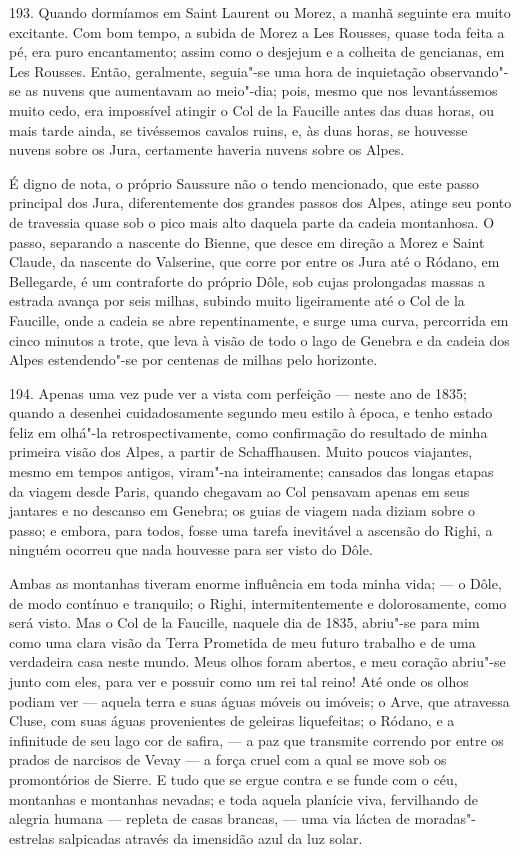193. Quando dormíamos em Saint Laurent ou Morez, a manhã seguinte era
muito excitante. Com bom tempo, a subida de Morez a Les Rousses, quase
toda feita a pé, era puro encantamento; assim como o desjejum e a
colheita de gencianas, em Les Rousses. Então, geralmente, seguia"-se uma
hora de inquietação observando"-se as nuvens que aumentavam ao meio"-dia;
pois, mesmo que nos levantássemos muito cedo, era impossível atingir o
Col de la Faucille antes das duas horas, ou mais tarde ainda, se
tivéssemos cavalos ruins, e, às duas horas, se houvesse nuvens sobre os
Jura, certamente haveria nuvens sobre os Alpes.

É digno de nota, o próprio Saussure não o tendo mencionado, que este
passo principal dos Jura, diferentemente dos grandes passos dos Alpes,
atinge seu ponto de travessia quase sob o pico mais alto daquela parte
da cadeia montanhosa. O passo, separando a nascente do Bienne, que desce
em direção a Morez e Saint Claude, da nascente do Valserine, que corre
por entre os Jura até o Ródano, em Bellegarde, é um contraforte do
próprio Dôle, sob cujas prolongadas massas a estrada avança por seis
milhas, subindo muito ligeiramente até o Col de la Faucille, onde a
cadeia se abre repentinamente, e surge uma curva, percorrida em cinco
minutos a trote, que leva à visão de todo o lago de Genebra e da cadeia
dos Alpes estendendo"-se por centenas de milhas pelo horizonte.

194. Apenas uma vez pude ver a vista com perfeição --- neste ano de 1835;
quando a desenhei cuidadosamente segundo meu estilo à época, e tenho
estado feliz em olhá"-la retrospectivamente, como confirmação do
resultado de minha primeira visão dos Alpes, a partir de Schaffhausen.
Muito poucos viajantes, mesmo em tempos antigos, viram"-na inteiramente;
cansados das longas etapas da viagem desde Paris, quando chegavam ao Col
pensavam apenas em seus jantares e no descanso em Genebra; os guias de
viagem nada diziam sobre o passo; e embora, para todos, fosse uma tarefa
inevitável a ascensão do Righi, a ninguém ocorreu que nada houvesse para
ser visto do Dôle.

Ambas as montanhas tiveram enorme influência em toda minha vida; --- o
Dôle, de modo contínuo e tranquilo; o Righi, intermitentemente e
dolorosamente, como será visto. Mas o Col de la Faucille, naquele dia de
1835, abriu"-se para mim como uma clara visão da Terra Prometida de meu
futuro trabalho e de uma verdadeira casa neste mundo. Meus olhos foram
abertos, e meu coração abriu"-se junto com eles, para ver e possuir como
um rei tal reino! Até onde os olhos podiam ver --- aquela terra e suas
águas móveis ou imóveis; o Arve, que atravessa Cluse, com suas águas
provenientes de geleiras liquefeitas; o Ródano, e a infinitude de seu
lago cor de safira, --- a paz que transmite correndo por entre os prados
de narcisos de Vevay --- a força cruel com a qual se move sob os
promontórios de Sierre. E tudo que se ergue contra e se funde com o céu,
montanhas e montanhas nevadas; e toda aquela planície viva, fervilhando
de alegria humana --- repleta de casas brancas, --- uma via láctea de
moradas"-estrelas salpicadas através da imensidão azul da luz solar.

